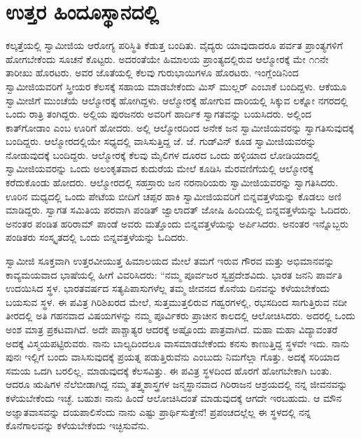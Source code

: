 
\chapter{ಉತ್ತರ ಹಿಂದೂಸ್ಥಾನದಲ್ಲಿ}

 ಕಲ್ಕತ್ತೆಯಲ್ಲಿ ಸ್ವಾಮೀಜಿಯ ಆರೋಗ್ಯ ಪರಿಸ್ಥಿತಿ ಕೆಡುತ್ತ ಬಂದಿತು. ವೈದ್ಯರು ಯಾವುದಾದರೂ ಪರ್ವತ ಪ್ರಾಂತ್ಯಗಳಿಗೆ ಹೋಗಬೇಕೆಂದು ಸೂಚನೆ ಕೊಟ್ಟರು. ಅದರಂತೆಯೇ ಹಿಮಾಲಯ ಪ್ರಾಂತ್ಯದಲ್ಲಿರುವ ಆಲ್ಮೋರಕ್ಕೆ ಮೇ ೧೧ನೇ ತಾರೀಖು ಹೊರಟರು. ಅವರ ಜೊತೆಯಲ್ಲಿ ಕೆಲವು ಗುರುಭಾಯಿಗಳೂ ಹೊರಟರು. ಇಂಗ್ಲೆಂಡಿನಿಂದ ಸ್ವಾಮೀಜಿಯವರಿಗೆ ಸ್ತ್ರೀಯರ ಕೆಲಸಕ್ಕೆ ಸಹಾಯ ಮಾಡಬೇಕೆಂದು ಮಿಸ್ ಮುಲ್ಲರ್ ಎಂಬಾಕೆ ಬಂದಿದ್ದಳು. ಆಕೆಯೂ ಸ್ವಾಮೀಜಿಗೆ ಮುಂಚೆಯೆ ಆಲ್ಮೋರಕ್ಕೆ ಹೋಗಿದ್ದಳು. ಆಲ್ಮೋರಕ್ಕೆ ಹೋಗುವ ದಾರಿಯಲ್ಲಿ ಸಿಕ್ಕುವ ಲಕ್ನೋ ನಗರದಲ್ಲಿ ಒಂದು ರಾತ್ರಿ ತಂಗಿದ್ದರು. ಅಲ್ಲಿಯ ಪುರಜನರು ಅವರಿಗೆ ಹಾರ್ದಿಕ ಸ್ವಾಗತವನ್ನು ಬಯಸಿದರು. ಅಲ್ಲಿಂದ ಕಾತ್‍ಗೋಡಾಂ ಎಂಬ ಊರಿಗೆ ಹೋದರು. ಅಲ್ಲಿ ಆಲ್ಮೋರದಿಂದ ಅನೇಕ ಜನ ಸ್ವಾಮೀಜಿಯವರನ್ನು ಸ್ವಾಗತಿಸುವುದಕ್ಕೆ ಬಂದಿದ್ದರು. ಆಲ್ಮೋರದಲ್ಲಿಯೇ ಸಧ್ಯದಲ್ಲಿ ವಾಸಿಸುತ್ತಿದ್ದ ಜೆ. ಜೆ. ಗುಡ್‍ವಿನ್ ಕೂಡ ಸ್ವಾಮೀಜಿಯವರನ್ನು ನೋಡುವುದಕ್ಕೆ ಬಂದಿದ್ದರು. ಆಲ್ಮೋರಕ್ಕೆ ಕೆಲವು ಮೈಲಿಗಳ ದೂರದ ಒಂದು ಹಳ್ಳಿಯಾದ ಲೋಡಿಯಾದಲ್ಲಿ ಸ್ವಾಮೀಜಿಯವರನ್ನು ಒಂದು ಅಲಂಕೃತವಾದ ಕುದುರೆಯ ಮೇಲೆ ಕೂಡಿಸಿ ಮೆರವಣಿಗೆಯಲ್ಲಿ ಆಲ್ಮೋರಕ್ಕೆ ಕರೆದುಕೊಂಡು ಹೋದರು. ಆಲ್ಮೋರದಲ್ಲಿ ಸಹಸ್ರಾರು ಜನ ನರನಾರಿಯರು ಸ್ವಾಮೀಜಿಯವರನ್ನು ಸ್ವಾಗತಿಸಿದರು. ಊರಿನ ಮಧ್ಯದಲ್ಲಿ ಒಂದು ಪೇಟೆಯ ಬೀದಿಗೆ ಚಪ್ಪರ ಹಾಕಿ ಸ್ವಾಮೀಜಿಯವರಿಗೆ ಬಿನ್ನವತ್ತಳೆಯನ್ನು ಕೊಡಲು ಅಣಿ ಮಾಡಿದ್ದರು. ಸ್ವಾಗತ ಸಮಿತಿಯ ಪರವಾಗಿ ಪಂಡಿತ್ ಜ್ವಾಲಾದತ್ ಜೋಷಿ ಹಿಂದಿಯಲ್ಲಿ ಬಿನ್ನವತ್ತಳೆಯನ್ನು ಓದಿದರು. ಅನಂತರ ಪಂಡಿತ ಹರಿರಾಮ್ ಪಾಂಡೆ ಅವರು ಮತ್ತೊಂದು ಬಿನ್ನವತ್ತಳೆಯನ್ನು ಅರ್ಪಿಸಿದರು. ಅನಂತರ ಇನ್ನೊಬ್ಬರು ಪಂಡಿತರು ಸಂಸ್ಕೃತದಲ್ಲಿ ಒಂದು ಬಿನ್ನವತ್ತಳೆಯನ್ನು ಓದಿದರು. 

 ಸ್ವಾಮೀಜಿ ಸೂಕ್ತವಾಗಿ ಉತ್ತರವೀಯುತ್ತ ಹಿಮಾಲಯದ ಮೇಲೆ ತಮಗೆ ಇರುವ ಗೌರವ ಮತ್ತು ಅಭಿಮಾನವನ್ನು ಕಾವ್ಯಮಯವಾದ ಭಾಷೆಯಲ್ಲಿ ಹೀಗೆ ವಿವರಿಸಿದರು: “ನಮ್ಮ ಪೂರ್ವಜರ ಸ್ವಪ್ರದೇಶವಿದು. ಭಾರತ ಜನನಿ ಪಾರ್ವತಿ ಉದಯಿಸಿದ ಸ್ಥಳ. ಭಾರತವರ್ಷದ ಸತ್ಯಪಿಪಾಸುಗಳೆಲ್ಲ ತಮ್ಮ ಜೀವನದ ಕೊನೆಯ ದಿನವನ್ನು ಕಳೆಯಬೇಕೆಂದು ಬಯಸುವ ಸ್ಥಳ. ಈ ಪವಿತ್ರ ಗಿರಿಶಿಖರದ ಮೇಲೆ, ಸುತ್ತಮುತ್ತಲಿರುವ ಗಹ್ವರಗಳಲ್ಲಿ, ರಭಸದಿಂದ ಸಾಗುತ್ತಿರುವ ನದೀ ತೀರದಲ್ಲಿ ಅತಿ ಗಹನವಾದ ವಿಷಯಗಳನ್ನು ನಮ್ಮ ಪೂರ್ವಿಕರು ಪ್ರಾಚೀನ ಕಾಲದಲ್ಲಿ ಆಲೋಚಿಸಿದರು. ಅದರಲ್ಲಿ ಒಂದು ಅಂಶ ಮಾತ್ರ ಪ್ರಕಟವಾಗಿದೆ. ಅದೇ ಪಾಶ್ಚಾತ್ಯರ ಆದರಕ್ಕೆ ಅಷ್ಟೊಂದು ಪಾತ್ರವಾಗಿದೆ. ಮಹಾ ಮಹಾ ವಿದ್ಯಾವಂತರೆ ಅದಕ್ಕೆ ವಿಸ್ಮಯಪಟ್ಟಿರುವರು. ನಾನು ಬಾಲ್ಯದಿಂದಲೂ ವಾಸಮಾಡಬೇಕೆಂದು ಕನಸು ಕಾಣುತ್ತಿದ್ದ ಸ್ಥಳವೇ ಇದು. ನಾನು ಪುನಃ ಇಲ್ಲಿಗೆ ಬಂದು ವಾಸಿಸುವುದಕ್ಕೆ ಪ್ರಯತ್ನ ಪಡುತ್ತಿರುವೆನು ಎಂಬುದು ನಿಮಗೆಲ್ಲಾ ಗೊತ್ತು. ಅದಕ್ಕೆ ಸರಿಯಾದ ಸಮಯ ಒದಗಿ ಬರಲಿಲ್ಲ. ಮಾಡುವುದಕ್ಕೆ ಕೆಲಸವಿತ್ತು. ಈ ಪವಿತ್ರ ಸ್ಥಳದಿಂದ ಹೊರಗೆ ಹೋಗಬೇಕಾಗಿ ಬಂತು. ಆದರೂ ಋಷಿಗಳ ನೆಲೆಬೀಡಾಗಿದ್ದ ನಮ್ಮ ತತ್ತ್ವಶಾಸ್ತ್ರಗಳ ಜನ್ಮಸ್ಥಾನವಾದ ಗಿರಿರಾಜನ ಆಶ್ರಯದಲ್ಲಿ ನನ್ನ ಜೀವನವನ್ನು ಕಳೆಯಬೇಕೆಂದು ಇಚ್ಛೆ. ಬಹುಶಃ ನಾನು ಹಿಂದೆ ಆಲೋಚಿಸಿದಂತೆ ಮಾಡುವುದಕ್ಕೆ ಆಗದೇ ಇರಬಹುದು. ಆ ಮೌನ ಅಜ್ಞಾತವಾಸವನ್ನು ದಯಪಾಲಿಸೆಂದು ನಾನು ಎಷ್ಟು ಪ್ರಾರ್ಥಿಸುತ್ತೇನೆ! ಪ್ರಪಂಚದಲ್ಲೆಲ್ಲ ಈ ಸ್ಥಳದಲ್ಲಿ ನನ್ನ ಕೊನೆಗಾಲವನ್ನು ಕಳೆಯಬೇಕೆಂದು ಇಚ್ಛಿಸುವೆನು.

